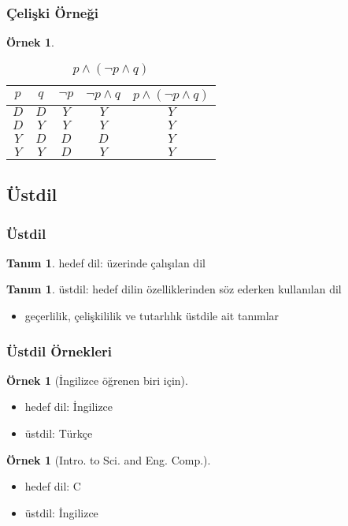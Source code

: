 \documentclass[dvipsnames]{beamer}
\theoremstyle{definition}
\newtheorem{tanim}[theorem]{Tanım}
\theoremstyle{example}
\newtheorem{ornek}[theorem]{Örnek}
\theoremstyle{plain}
\begin{document}
\begin{frame}
  \frametitle{Çelişki Örneği}

  \begin{ornek}
    \begin{table}
      \caption{$p \wedge (\neg p \wedge q)$}
      \begin{tabular}{|c|c|c|c||c|}\hline
        $p$ & $q$ & $\neg p$ & $\neg p \wedge q$
            & $p \wedge (\neg p \wedge q)$\\\hline\hline
        $D$ & $D$ & $Y$ & $Y$ & $Y$       \\\hline
        $D$ & $Y$ & $Y$ & $Y$ & $Y$       \\\hline
        $Y$ & $D$ & $D$ & $D$ & $Y$       \\\hline
        $Y$ & $Y$ & $D$ & $Y$ & $Y$       \\\hline
      \end{tabular}
    \end{table}
  \end{ornek}
\end{frame}

\subsection{Üstdil}

\begin{frame}
  \frametitle{Üstdil}

  \begin{tanim}
    \alert{hedef dil}: üzerinde çalışılan dil
  \end{tanim}

  \pause
  \begin{tanim}
    \alert{üstdil}: hedef dilin özelliklerinden söz ederken kullanılan dil
  \end{tanim}

  \pause
  \begin{itemize}
    \item geçerlilik, çelişkililik ve tutarlılık üstdile ait tanımlar
  \end{itemize}
\end{frame}

\begin{frame}
  \frametitle{Üstdil Örnekleri}

  \begin{ornek}[İngilizce öğrenen biri için]
    \begin{itemize}
      \item hedef dil: İngilizce
      \item üstdil: Türkçe
    \end{itemize}
  \end{ornek}

  \pause
  \begin{ornek}[Intro. to Sci. and Eng. Comp.]
    \begin{itemize}
      \item hedef dil: C
      \item üstdil: İngilizce
    \end{itemize}
  \end{ornek}
\end{frame}
\end{document}
